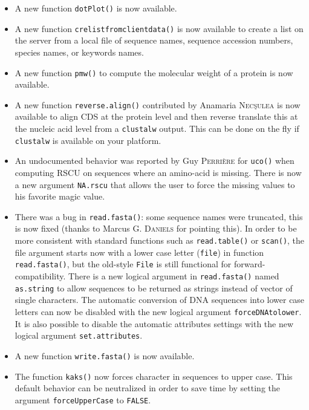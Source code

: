 \documentclass{article}
\begin{document}
\begin{itemize}

\item A  new function \texttt{dotPlot()} is now available.

\item A new function \texttt{crelistfromclientdata()} is now available to
create a list on the server from a local file of sequence names, sequence
accession numbers, species names, or keywords names.

\item A new function \texttt{pmw()} to compute the molecular weight of
a protein is now available.

\item A new function \texttt{reverse.align()} contributed by Anamaria \textsc{Nec\c{s}ulea}
is now available to align CDS at the protein level and then reverse translate this at
the nucleic acid level from a \texttt{clustalw} output. This can be done on the fly
if \texttt{clustalw} is available on your platform.

\item An undocumented behavior was reported by Guy \textsc{Perri{\`e}re} for \texttt{uco()}
when computing RSCU on sequences where an amino-acid is missing. There is
now a new argument \texttt{NA.rscu} that allows the user to force the
missing values to his favorite magic value.

\item There was a bug in \texttt{read.fasta()}: some sequence names were
truncated, this is now fixed (thanks to Marcus G. \textsc{Daniels} for pointing this).
In order to be more consistent with standard functions such as \texttt{read.table()}
or \texttt{scan()}, the file argument starts now with a lower case letter (\texttt{file})
in function \texttt{read.fasta()}, but the old-style \texttt{File} is still
functional for forward-compatibility. There is a new logical argument in \texttt{read.fasta()}
named \texttt{as.string} to allow sequences to be returned as strings instead of
vector of single characters. The automatic conversion of DNA sequences into
lower case letters can now be disabled with the new logical argument
\texttt{forceDNAtolower}. It is also possible to disable the automatic attributes
settings with the new logical argument \texttt{set.attributes}.

\item A new function \texttt{write.fasta()} is now available.

\item The function \texttt{kaks()} now forces character in sequences to upper case.
This default behavior can be neutralized in order to save time by setting the
argument \texttt{forceUpperCase} to \texttt{FALSE}.

\end{itemize}
\end{document}
